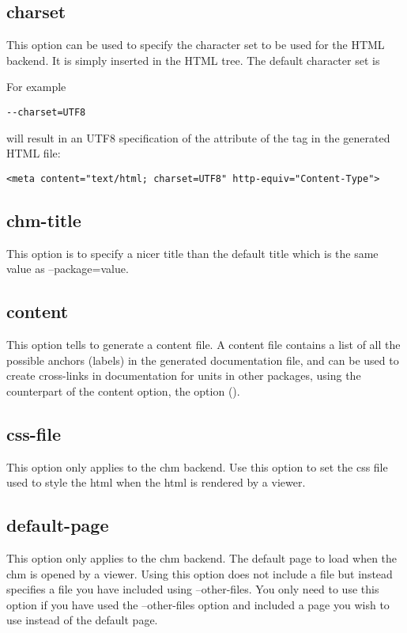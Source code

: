 \subsection{charset}
\label{suse:charset}
This option can be used to specify the character set to be used for
the HTML backend. It is simply inserted in the HTML tree. The default
character set is 

For example
\begin{verbatim}
--charset=UTF8
\end{verbatim}
will result in an UTF8 specification of the  attribute of 
the  tag in the generated HTML file:
\begin{verbatim}
<meta content="text/html; charset=UTF8" http-equiv="Content-Type">
\end{verbatim}

\subsection{chm-title}
\label{suse:chm-title}
This option is to specify a nicer title than the default title which is
the same value as --package=value.

\subsection{content}
\label{suse:content}
This option tells  \fpdoc to generate a content file. 
A content file contains a list of all the
possible anchors (labels) in the generated documentation file, and can be
used to create cross-links in documentation for units in other packages, 
using the counterpart of the content option, the  option
().

\subsection{css-file}
\label{suse:css-file}
This option only applies to the chm backend. Use this option to set the css
file used to style the html when the html is rendered by a viewer.

\subsection{default-page}
\label{suse:default-page}
This option only applies to the chm backend. The default page to load 
when the chm is opened by a viewer. Using this option does not include a file
but instead specifies a file you have included using --other-files. You only 
need to use this option if you have used the --other-files option and included 
a page you wish to use instead of the default page.

